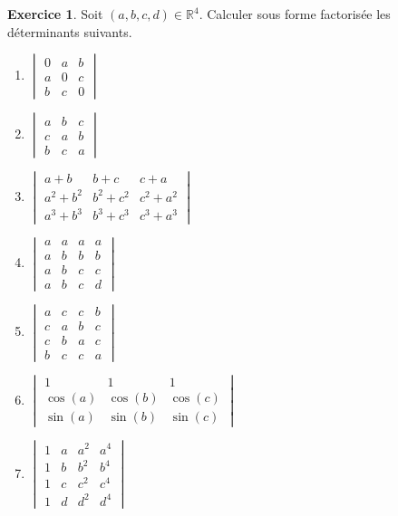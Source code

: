 \documentclass[french]{book}
\newcommand{\R}{\mathbb{R}}
\theoremstyle{definition}
\newtheorem{ex}{Exercice}[chapter]
\theoremstyle{theorem}
\theoremstyle{remark}
\begin{document}
\begin{ex}
	Soit $(a,b,c,d)\in\R^4$. Calculer sous forme factorisée les déterminants suivants.
	\begin{enumerate}
		\item $\displaystyle\begin{vmatrix}
			0&a&b\\
			a&0&c\\
			b&c&0
		\end{vmatrix}$
		\item $\displaystyle\begin{vmatrix}
			a&b&c\\
			c&a&b\\
			b&c&a
		\end{vmatrix}$
		\item $\displaystyle\begin{vmatrix}
			a+b&b+c&c+a\\
			a^2+b^2&b^2+c^2&c^2+a^2\\
			a^3+b^3&b^3+c^3&c^3+a^3
		\end{vmatrix}$
		\item $\displaystyle\begin{vmatrix}
			a&a&a&a\\
			a&b&b&b\\
			a&b&c&c\\
			a&b&c&d
		\end{vmatrix}$
		\item $\displaystyle\begin{vmatrix}
			a&c&c&b\\
			c&a&b&c\\
			c&b&a&c\\
			b&c&c&a
		\end{vmatrix}$
		\item $\displaystyle\begin{vmatrix}
		1&1&1\\
		\cos(a)&\cos(b)&\cos(c)\\
		\sin(a)&\sin(b)&\sin(c)
		\end{vmatrix}$
		\item $\displaystyle\begin{vmatrix}
			1&a&a^2&a^4\\
			1&b&b^2&b^4\\
			1&c&c^2&c^4\\
			1&d&d^2&d^4
		\end{vmatrix}$
	\end{enumerate}
\end{ex}
\end{document}
